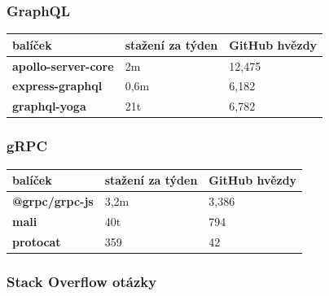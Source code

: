 \documentclass[thesis=M,czech]{FITthesis}[2019/12/23]
\begin{document}
\subsubsection*{GraphQL}
\begin{table}[H]
  \begin{tabular}{|l|l|l|}
  \hline
  \textbf{balíček}                                 & \textbf{stažení za týden}                           & \textbf{GitHub hvězdy} \\ \hline
  \textbf{apollo-server-core}                      & 2m                                                  & 12,475                 \\ \hline
  \textbf{express-graphql}                         & 0,6m                                                & 6,182                  \\ \hline
  \textbf{graphql-yoga}                            & 21t                                                 & 6,782                  \\ \hline
  \end{tabular}
\end{table}

\subsubsection*{gRPC}
\begin{table}[H]
  \begin{tabular}{|l|l|l|}
  \hline
  \textbf{balíček}                                 & \textbf{stažení za týden}                           & \textbf{GitHub hvězdy} \\ \hline
  \textbf{@grpc/grpc-js}                           & 3,2m                                                & 3,386                  \\ \hline
  \textbf{mali}                                    & 40t                                                 & 794                    \\ \hline
  \textbf{protocat}                                & 359                                                 & 42                     \\ \hline
  \end{tabular}
\end{table}
\subsubsection*{Stack Overflow otázky}
\end{document}
